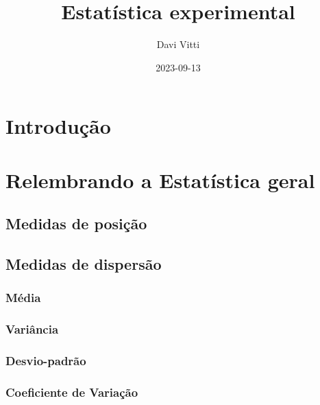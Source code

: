 \documentclass[
]{book}
\title{Estatística experimental}
\author{Davi Vitti}
\date{2023-09-13}
\begin{document}
\maketitle

{
\setcounter{tocdepth}{1}
\tableofcontents
}
\hypertarget{introduuxe7uxe3o}{%
\chapter{Introdução}\label{introduuxe7uxe3o}}

\hypertarget{relembrando-a-estatuxedstica-geral}{%
\chapter{Relembrando a Estatística geral}\label{relembrando-a-estatuxedstica-geral}}

\hypertarget{medidas-de-posiuxe7uxe3o}{%
\section{Medidas de posição}\label{medidas-de-posiuxe7uxe3o}}

\hypertarget{medidas-de-dispersuxe3o}{%
\section{Medidas de dispersão}\label{medidas-de-dispersuxe3o}}

\hypertarget{muxe9dia}{%
\subsection*{Média}\label{muxe9dia}}

\hypertarget{variuxe2ncia}{%
\subsection*{Variância}\label{variuxe2ncia}}

\hypertarget{desvio-padruxe3o}{%
\subsection*{Desvio-padrão}\label{desvio-padruxe3o}}

\hypertarget{coeficiente-de-variauxe7uxe3o}{%
\subsection*{Coeficiente de Variação}\label{coeficiente-de-variauxe7uxe3o}}
\end{document}
